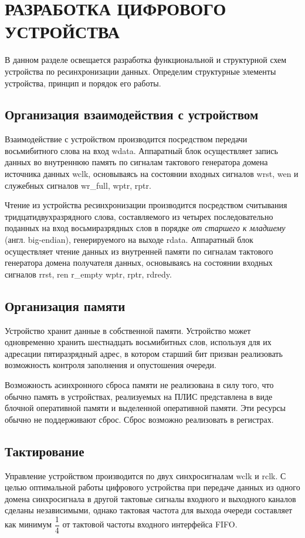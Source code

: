 \newcommand{\erdatamodaler}{ERwin Data Modeler~}

\chapter{РАЗРАБОТКА ЦИФРОВОГО УСТРОЙСТВА}

В данном разделе освещается разработка функциональной и структурной схем устройства по ресинхронизации данных. Определим структурные элементы устройства, принцип и порядок его работы.

\section{Организация взаимодействия с устройством}
Взаимодействие с устройством производится посредством передачи восьмибитного слова на вход wdata. Аппаратный блок осуществляет запись данных во внутреннюю память по сигналам тактового генератора домена источника данных wclk, основываясь на состоянии входных сигналов wrst, wen и служебных сигналов wr\_full,  wptr, rptr.

Чтение из устройства ресинхронизации производится посредством считывания тридцатидвухразрядного слова, составляемого из четырех последовательно поданных на вход восьмиразрядных слов в порядке \textit{от старшего к младшему} (англ. big-endian), генерируемого на выходе rdata. Аппаратный блок осуществляет чтение данных из внутренней памяти по сигналам тактового генератора домена получателя данных, основываясь на состоянии входных сигналов rrst, ren  r\_empty wptr, rptr, rdredy.

\section{Организация памяти}

Устройство хранит данные в собственной памяти. Устройство может одновременно хранить шестнадцать восьмибитных слов, используя для их адресации пятиразрядный адрес, в котором старший бит призван реализовать возможность контроля заполнения и опустошения очереди. 

Возможность асинхронного сброса памяти не реализована в силу того, что обычно память в устройствах, реализуемых на ПЛИС представлена в виде блочной оперативной памяти и выделенной оперативной памяти. Эти ресурсы обычно не поддерживают сброс. Сброс возможно реализовать в регистрах. 



\section{Тактирование}
Управление устройством производится по двух синхросигналам wclk и rclk. С целью оптимальной работы цифрового устройства при передаче данных из одного домена синхросигнала в другой тактовые сигналы входного и выходного каналов сделаны независимыми, однако тактовая частота для выхода очереди составляет как минимум $\dfrac14$ от тактовой частоты входного интерфейса FIFO.

